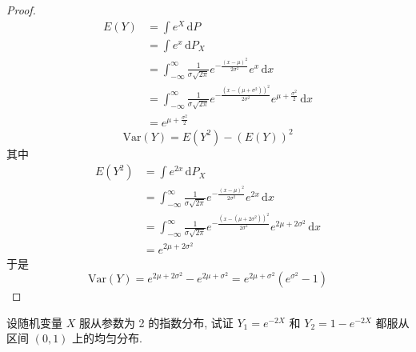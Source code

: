 \documentclass[../main.tex]{subfiles}
\begin{document}
\begin{proof}
  \[
 \begin{aligned}
  E\left( Y \right)&=  \int e^{X}\,\mathrm{d} P\\ 
   &= \int e^{x} \,\mathrm{d} P_{X}\\ 
    &=  \int_{-\infty}^{\infty}\frac{1 }{ \sigma \sqrt{2 \pi } }e^{-\frac{\left( x-\mu  \right) ^{2} }{2  \sigma ^{2}} }e^{x}\,\mathrm{d} x\\ 
     &= \int_{-\infty}^{\infty}\frac{1 }{ \sigma \sqrt{2 \pi } }e^{-\frac{\left( x-\left( \mu +  \sigma ^{2} \right)  \right)^{2}  }{2 \sigma ^{2} } }e^{\mu + \frac{ \sigma ^{2} }{2 } } \,\mathrm{d} x\\ 
      &= e^{\mu + \frac{ \sigma ^{2} }{2 } } 
 \end{aligned}  
  \] \[
  \mathrm{Var}\left( Y \right)= E\left( Y^{2} \right)-\left( E\left( Y \right)  \right)^{2}   
  \]其中 \[
  \begin{aligned}
  E\left( Y^{2} \right)&= \int e^{2x}\,\mathrm{d} P_{X}  \\ 
   &=  \int_{-\infty}^{\infty}\frac{1 }{ \sigma \sqrt{2 \pi } }e^{-\frac{\left( x-\mu  \right)^{2}  }{2 \sigma ^{2} } }e^{2x}\,\mathrm{d} x\\ 
    &= \int_{-\infty}^{\infty}\frac{1 }{ \sigma \sqrt{2 \pi } }e^{-\frac{\left( x-\left( \mu + 2 \sigma ^{2} \right)  \right)^{2}  }{2 \sigma ^{2} } }e^{2\mu + 2 \sigma ^{2}}\,\mathrm{d} x\\ 
     &= e^{2\mu + 2 \sigma ^{2}}  
  \end{aligned}
  \]于是 \[
  \mathrm{Var}\left( Y \right)= e^{2\mu + 2 \sigma ^{2}}- e^{2\mu +  \sigma ^{2}}= e^{2\mu +  \sigma ^{2}}\left( e^{ \sigma ^{2}}-1 \right)  
  \]
\end{proof}
\begin{exercise}{}{}
设随机变量 $X$ 服从参数为 2 的指数分布, 试证 $Y_1 = e^{-2X}$ 和 $Y_2 = 1 - e^{-2X}$ 都服从区间 $(0,1)$ 上的均匀分布.
\end{exercise}
\end{document}
